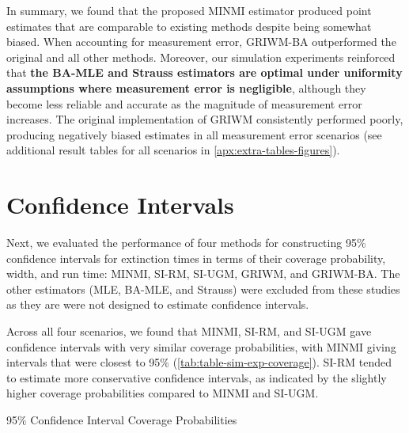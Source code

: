 In summary, we found that the proposed MINMI estimator produced point estimates that are comparable to existing methods despite being somewhat biased. When accounting for measurement error, GRIWM-BA outperformed the original and all other methods. Moreover, our simulation experiments reinforced that \textbf{the BA-MLE and Strauss estimators are optimal under uniformity assumptions where measurement error is negligible}, although they become less reliable and accurate as the magnitude of measurement error increases. The original implementation of GRIWM consistently performed poorly, producing negatively biased estimates in all measurement error scenarios (see additional result tables for all scenarios in \autoref{apx:extra-tables-figures}).

\section{Confidence Intervals}

Next, we evaluated the performance of four methods for constructing 95\% confidence intervals for extinction times in terms of their coverage probability, width, and run time: MINMI, SI-RM, SI-UGM, GRIWM, and GRIWM-BA. The other estimators (MLE, BA-MLE, and Strauss) were excluded from these studies as they are were not designed to estimate confidence intervals.

Across all four scenarios, we found that MINMI, SI-RM, and SI-UGM gave confidence intervals with very similar coverage probabilities, with MINMI giving intervals that were closest to 95\% (\autoref{tab:table-sim-exp-coverage}). SI-RM tended to estimate more conservative confidence intervals, as indicated by the slightly higher coverage probabilities compared to MINMI and SI-UGM.
\begin{table}[ht]
    \centering
    \caption{95\% Confidence Interval Coverage Probabilities}
    
    \label{tab:table-sim-exp-coverage}
    \vspace{-4mm}
\end{table}

